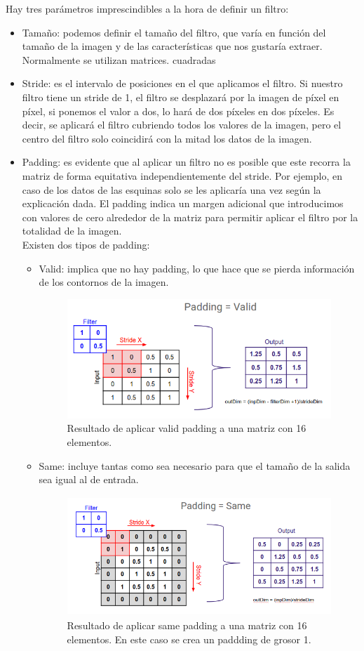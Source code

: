 \documentclass[a4paper,11pt]{article}
\begin{document}
\noindent
Hay tres parámetros imprescindibles a la hora de definir un filtro:
\begin{itemize}
\item Tamaño: podemos definir el tamaño del filtro, que varía en función del tamaño de la imagen y de las características que nos gustaría extraer.  Normalmente se utilizan matrices. cuadradas
\item Stride:  es el intervalo de posiciones en el que aplicamos el filtro. Si nuestro filtro tiene un stride de 1, el filtro se desplazará por la imagen de píxel en píxel,  si ponemos el valor a dos, lo hará de dos píxeles en dos píxeles. Es decir, se aplicará el filtro cubriendo todos los valores de la imagen, pero el centro del filtro solo coincidirá con la mitad los datos de la imagen. 
\item Padding: es evidente que al aplicar un filtro no es posible que este recorra la matriz de forma equitativa independientemente del stride. Por ejemplo, en caso de los datos de las esquinas solo se les aplicaría una vez según la explicación dada. El padding indica un margen adicional que introducimos con valores de cero alrededor de la matriz para permitir aplicar el filtro por la totalidad de la imagen. \\

\noindent
Existen dos tipos de padding:
	\begin{itemize}
	\item Valid: implica que no hay padding, lo que hace que se pierda información de los contornos de la imagen.\begin{figure}[H]
\centering
\includegraphics[width=10.0cm, height=4.5cm]{Annotation 2020-04-13 214927.png}
\caption{Resultado de aplicar valid padding a una matriz con 16 elementos.}
\end{figure}
	\item Same: incluye tantas como sea necesario para que el tamaño de la salida sea igual al de entrada.\begin{figure}[H]
\centering
\includegraphics[width=11.0cm, height=4.5cm]{Annotation 2020-04-13 215118.png}
\caption{Resultado de aplicar same padding a una matriz con 16 elementos. En este caso se crea un paddding de grosor 1.}
\end{figure}
	\end{itemize}
\end{itemize}
\end{document}
